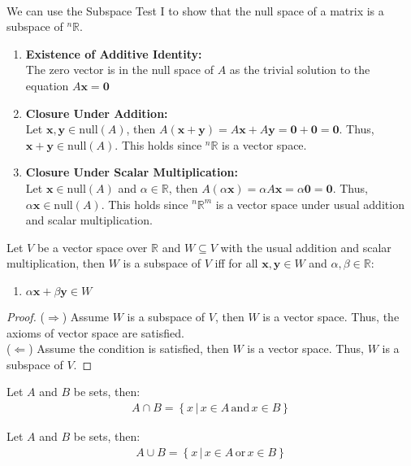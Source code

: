 \documentclass[11pt]{report}
\begin{document}
    \paragraph{} We can use the Subspace Test I to show that the null space of a matrix is a subspace of $^n\mathbb{R}$.
        \begin{enumerate}
            \item \textbf{Existence of Additive Identity:} \\
            The zero vector is in the null space of $A$ as the trivial solution to the equation $A\textbf{x} = \textbf{0}$
            \item \textbf{Closure Under Addition:} \\
            Let $\textbf{x}, \textbf{y} \in \text{null}(A)$, then $A(\textbf{x} + \textbf{y}) = A\textbf{x} + A\textbf{y} = \textbf{0} + \textbf{0} = \textbf{0}$. Thus, $\textbf{x} + \textbf{y} \in \text{null}(A)$. This holds since $^n\mathbb{R}$ is a vector space.
            \item \textbf{Closure Under Scalar Multiplication:} \\
            Let $\textbf{x} \in \text{null}(A)$ and $\alpha \in \mathbb{R}$, then $A(\alpha \textbf{x}) = \alpha A\textbf{x} = \alpha \textbf{0} = \textbf{0}$. Thus, $\alpha \textbf{x} \in \text{null}(A)$. This holds since $^n\mathbb{R}^m$ is a vector space under usual addition and scalar multiplication.
        \end{enumerate}
\begin{theorem}
    Let $V$ be a vector space over $\mathbb{R}$ and $W \subseteq V$ with the usual addition and scalar multiplication, then $W$ is a subspace of $V$ iff for all $\textbf{x}, \textbf{y} \in W$ and $\alpha, \beta \in \mathbb{R}$:
    \begin{enumerate}
        \item $\alpha \textbf{x} + \beta \textbf{y} \in W$
    \end{enumerate}
\end{theorem}
\begin{proof}
    ($\Rightarrow$) Assume $W$ is a subspace of $V$, then $W$ is a vector space. Thus, the axioms of vector space are satisfied. \\
    ($\Leftarrow$) Assume the condition is satisfied, then $W$ is a vector space. Thus, $W$ is a subspace of $V$.
\end{proof}
\begin{definition}
    Let $A$ and $B$ be sets, then:
    \begin{align}
        A \cap B = \left\{ x \, | \, x \in A \, \text{and} \, x \in B \right\}
    \end{align}
\end{definition}
\begin{definition}
    Let $A$ and $B$ be sets, then:
    \begin{align}
        A \cup B = \left\{ x \, | \, x \in A \, \text{or} \, x \in B \right\}
    \end{align}
\end{definition}
\end{document}
